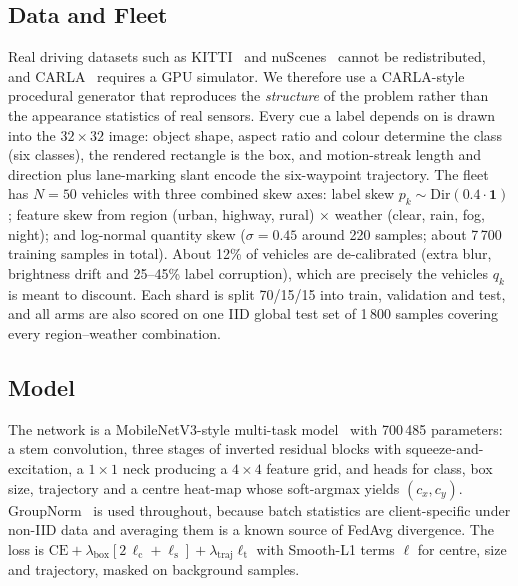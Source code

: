 \documentclass[journal]{IEEEtran}
\begin{document}
\subsection{Data and Fleet}
Real driving datasets such as KITTI~\cite{geiger2012kitti} and nuScenes~\cite{caesar2020nuscenes} cannot be redistributed, and CARLA~\cite{dosovitskiy2017carla} requires a GPU simulator. We therefore use a CARLA-style procedural generator that reproduces the \emph{structure} of the problem rather than the appearance statistics of real sensors. Every cue a label depends on is drawn into the $32\times32$ image: object shape, aspect ratio and colour determine the class (six classes), the rendered rectangle is the box, and motion-streak length and direction plus lane-marking slant encode the six-waypoint trajectory. The fleet has $N=50$ vehicles with three combined skew axes: label skew $p_k\sim\mathrm{Dir}(0.4\cdot\mathbf{1})$; feature skew from region (urban, highway, rural) $\times$ weather (clear, rain, fog, night); and log-normal quantity skew ($\sigma=0.45$ around 220 samples; about 7\,700 training samples in total). About 12\% of vehicles are de-calibrated (extra blur, brightness drift and 25--45\% label corruption), which are precisely the vehicles $q_k$ is meant to discount. Each shard is split 70/15/15 into train, validation and test, and all arms are also scored on one IID global test set of 1\,800 samples covering every region--weather combination.

\subsection{Model}
The network is a MobileNetV3-style multi-task model~\cite{howard2019mobilenetv3} with 700\,485 parameters: a stem convolution, three stages of inverted residual blocks with squeeze-and-excitation, a $1\times1$ neck producing a $4\times4$ feature grid, and heads for class, box size, trajectory and a centre heat-map whose soft-argmax yields $(c_x,c_y)$. GroupNorm~\cite{wu2018groupnorm} is used throughout, because batch statistics are client-specific under non-IID data and averaging them is a known source of FedAvg divergence. The loss is $\mathrm{CE}+\lambda_{\mathrm{box}}[2\,\ell_{\mathrm{c}}+\ell_{\mathrm{s}}]+\lambda_{\mathrm{traj}}\ell_{\mathrm{t}}$ with Smooth-L1 terms $\ell$ for centre, size and trajectory, masked on background samples.
\end{document}
